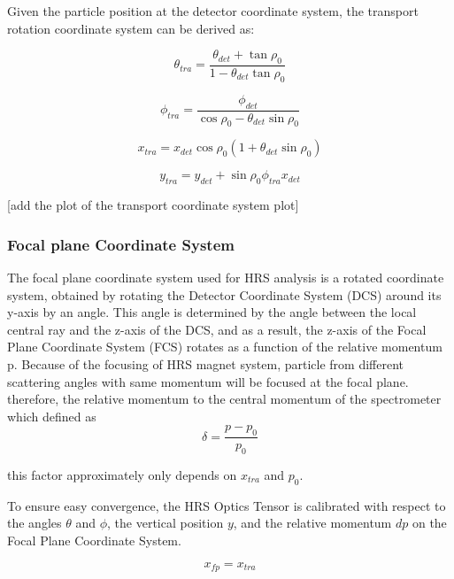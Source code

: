 Given the particle position at the detector coordinate system, the transport rotation coordinate system can be derived as:

\begin{equation}
    \theta_{tra}  = \frac{\theta_{det} + \tan{\rho_0}}{1 - \theta_{det}\tan{\rho_0}} 
\end{equation}

\begin{equation}
    \phi_{tra} = \frac{\phi_{det}}{\cos{\rho_0} - \theta_{det}\sin{\rho_0}}
\end{equation}

\begin{equation}
    x_{tra} = x_{det}\cos{\rho_0}(1 + \theta_{det}\sin{\rho_0})
\end{equation}

\begin{equation}
    y_{tra} = y_{det} + \sin{\rho_0}\phi_{tra}x_{det}
\end{equation}


[add the plot of the transport coordinate system plot]


\subsubsection{Focal plane Coordinate System}

The focal plane coordinate system used for HRS analysis is a rotated coordinate system, obtained by rotating the Detector Coordinate System (DCS) around its y-axis by an angle. This angle is determined by the angle between the local central ray and the z-axis of the DCS, and as a result, the z-axis of the Focal Plane Coordinate System (FCS) rotates as a function of the relative momentum p. Because of the focusing of HRS magnet system,  particle from different scattering angles with same momentum will be focused at the focal plane. therefore, the relative momentum to the central momentum of the spectrometer which defined as 
\begin{equation}
    \delta = \frac{p-p_0}{p_0}
\end{equation}

this factor approximately only depends on $x_{tra}$ and $p_0$.

To ensure easy convergence, the HRS Optics Tensor is calibrated with respect to the angles $\theta$ and $\phi$, the vertical position $y$, and the relative momentum $dp$ on the Focal Plane Coordinate System.

\begin{equation}
    x_{fp} = x_{tra}    \label{eq:cpt3_fps_1}
\end{equation}

